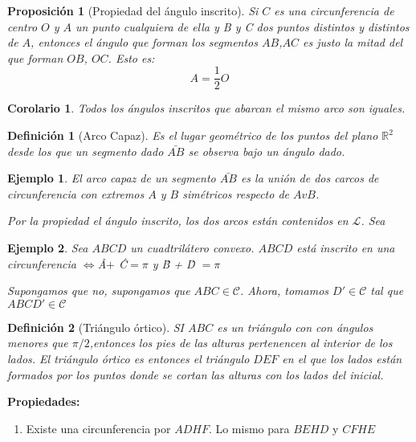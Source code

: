 \documentclass[11pt, a4paper, titlepage]{article}
\makeatletter
\renewenvironment{proof}[1][\proofname] {\vspace{-15pt}\par\pushQED{\qed}\normalfont\topsep6\p@\@plus6\p@\relax\trivlist\item[\hskip\labelsep\it#1\@addpunct{.}]\ignorespaces}{\popQED\endtrivlist\@endpefalse}
\newcommand{\R}{\mathbb{R}}
\theoremstyle{theorem-style}
\newtheorem*{nprop}{Proposición}
\newtheorem{ncor}{Corolario}
\theoremstyle{definition-style}
\newtheorem*{ndef}{Definición}
\theoremstyle{remark-style}
\theoremstyle{example-style}
\newtheorem*{ejemplo}{Ejemplo}
\newenvironment{nlist}
{\begin{enumerate}
    \renewcommand\labelenumi{(\emph{\roman{enumi})}}}
  {\end{enumerate}}
\makeatother
\begin{document}
\begin{nprop}[Propiedad del ángulo inscrito]
  Si $C$ es una circunferencia de centro $O$ y $A$ un punto cualquiera de ella y B y C dos puntos distintos y distintos de $A$, entonces el ángulo que forman los segmentos $AB$,$AC$ es justo la mitad del que forman $OB$, $OC$. Esto es:
  \[
    A = \dfrac{1}{2} O
  \]
\end{nprop}
\begin{ncor}
  Todos los ángulos inscritos que abarcan el mismo arco son iguales.
\end{ncor}

\begin{ndef}[Arco Capaz]
	Es el lugar geométrico de los puntos del plano $\R^2$ desde los que un segmento dado $\bar{AB}$ se observa bajo un ángulo dado.
\end{ndef}

\begin{ejemplo}
	El arco capaz de un segmento $\bar{AB}$ es la unión de dos carcos de circunferencia con extremos $A$ y $B$ simétricos respecto de $AvB$.
	
	\begin{proof}[Solución]
	Por la propiedad el ángulo inscrito, los dos arcos están contenidos en $\mathcal L$. Sea 
	
\end{proof}
\end{ejemplo}
\begin{ejemplo}
	Sea $ABCD$ un cuadtrilátero convexo. $ABCD$ está inscrito en una circunferencia $\iff $\^{A}$ +$ \^{C}$ = \pi$ y \^{B} + \^{D} $ = \pi$
	\begin{proof}
	Supongamos que no, supongamos que $ABC \in \mathcal C$. Ahora, tomamos $D' \in \mathcal C$ tal que $ABCD' \in \mathcal C $
\end{proof}
\end{ejemplo}

\begin{ndef}[Triángulo órtico]
	SI $ABC$ es un triángulo con con ángulos menores que $\pi/2$,entonces los pies de las alturas pertenencen al interior de los lados. El triángulo órtico es entonces el triángulo $DEF$ en el que los lados están formados por los puntos donde se cortan las alturas con los lados del inicial.
\end{ndef}

\textbf{Propiedades:}\\
\begin{nlist}
	\item Existe una circunferencia por $ADHF$. Lo mismo para $BEHD$ y $CFHE$
\end{nlist}
\end{document}
